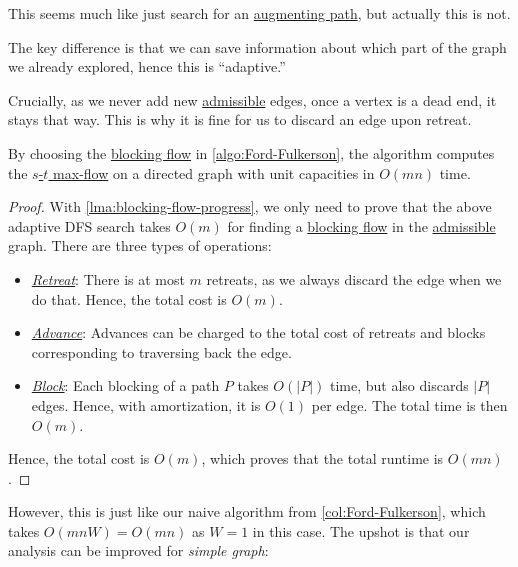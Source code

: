 This seems much like just search for an \hyperref[def:augmenting-path]{augmenting path}, but actually this is not.

\begin{intuition}
	The key difference is that we can save information about which part of the graph we already explored, hence this is ``adaptive.''
\end{intuition}

Crucially, as we never add new \hyperref[def:admissible]{admissible} edges, once a vertex is a dead end, it stays that way. This is why it is fine for us to discard an edge upon retreat.

\begin{theorem}\label{thmj:Ford-Fulkerson-blocking-flow-unit}
	By choosing the \hyperref[def:blocking-flow]{blocking flow} in \autoref{algo:Ford-Fulkerson}, the algorithm computes the \hyperref[prb:s-t-max-flow]{\(s\)-\(t\) max-flow} on a directed graph with unit capacities in \(O(mn)\) time.
\end{theorem}
\begin{proof}
	With \autoref{lma:blocking-flow-progress}, we only need to prove that the above adaptive DFS search takes \(O(m)\) for finding a \hyperref[def:blocking-flow]{blocking flow} in the \hyperref[def:admissible]{admissible} graph. There are three types of operations:
	\begin{itemize}
		\item \hyperref[algo:unit-adaptive-DFS-retreat]{\emph{Retreat}}: There is at most \(m\) retreats, as we always discard the edge when we do that. Hence, the total cost is \(O(m)\).
		\item \hyperref[algo:unit-adaptive-DFS-advance]{\emph{Advance}}: Advances can be charged to the total cost of retreats and blocks corresponding to traversing back the edge.
		\item \hyperref[algo:unit-adaptive-DFS-block]{\emph{Block}}: Each blocking of a path \(P\) takes \(O(\lvert P \rvert )\) time, but also discards \(\lvert P \rvert \) edges. Hence, with amortization, it is \(O(1)\) per edge. The total time is then \(O(m)\).
	\end{itemize}
	Hence, the total cost is \(O(m)\), which proves that the total runtime is \(O(mn)\).
\end{proof}

However, this is just like our naive algorithm from \autoref{col:Ford-Fulkerson}, which takes \(O(mnW) = O(mn)\) as \(W = 1\) in this case. The upshot is that our analysis can be improved for \emph{simple graph}:


